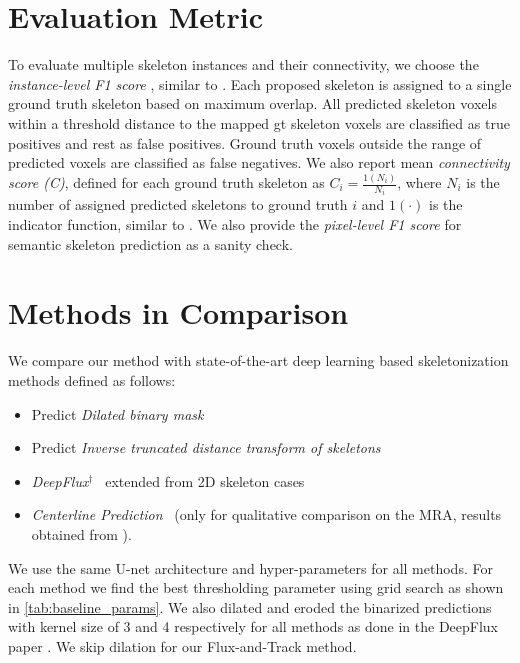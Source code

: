 \section{Evaluation Metric}
To evaluate multiple skeleton instances and their connectivity, we choose the {\em instance-level F1 score} , similar to \cite{Liang2019}. Each proposed skeleton is assigned to a single ground truth skeleton based on maximum overlap. All predicted skeleton voxels within a threshold distance to the mapped gt skeleton voxels are classified as true positives and rest as false positives. Ground truth voxels outside the range of predicted voxels are classified as false negatives. We also report mean {\em connectivity score (C)}, defined for each ground truth skeleton as $C_{i} = \frac{1(N_{i})}{N_{i}}$, where $N_{i}$ is the number of assigned predicted skeletons to ground truth $i$ and $1(\cdot)$ is the indicator function, similar to \cite{Liang2019}.
We also provide the {\em pixel-level F1 score} for semantic skeleton prediction as a sanity check.

\section{Methods in Comparison}
 We compare our method with state-of-the-art deep learning based skeletonization methods defined as follows:
 
\begin{itemize}
	\item Predict {\em Dilated binary mask}~\cite{cciccek20163d,Tetteh2018}
	\item Predict {\em Inverse truncated distance transform of skeletons}~\cite{wang2019deep}
	\item {\em DeepFlux$^{\dagger}$}~\cite{Wang2019} extended from 2D skeleton cases
	\item {\em Centerline Prediction}~\cite{sironi2015} (only for qualitative comparison on the MRA, results obtained from \cite{Koziski2018}).
\end{itemize}

We use the same U-net architecture and hyper-parameters for all methods. For each method we find the best thresholding parameter using grid search as shown in \autoref{tab:baseline_params}. We also dilated and eroded the binarized predictions with kernel size of 3 and 4 respectively for all methods as done in the DeepFlux paper \cite{Wang2019}. We skip dilation for our Flux-and-Track method.

